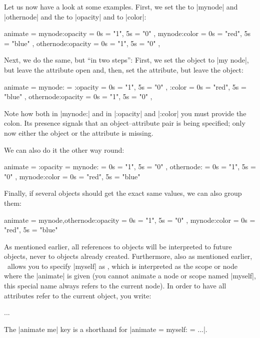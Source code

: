 Let us now have a look at some examples. First, we set the
 to |mynode| and |othernode| and the
 to |opacity| and to |color|: 

\begin{codeexample}
animate = {
  mynode:opacity    = { 0s = "1",   5s = "0" },
  mynode:color      = { 0s = "red", 5s = "blue" },
  othernode:opacity = { 0s = "1",   5s = "0" },
}
\end{codeexample}

Next, we do the same, but ``in two steps'': First, we set the object
to |my node|, but leave the attribute open and, then, set the
attribute, but leave the object:
\begin{codeexample}
animate = {
  mynode: = {
    :opacity        = { 0s = "1",   5s = "0" },
    :color          = { 0s = "red", 5s = "blue" }
  },
  othernode:opacity = { 0s = "1",   5s = "0" },
}
\end{codeexample}
Note how both in  |mynode:| and in  |:opacity| and |:color| you must
provide the colon. Its presence signals that an object--attribute pair
is being specified; only now either the object or the attribute is
missing. 

We can also do it the other way round:
\begin{codeexample}
animate = {
  :opacity = {
    mynode:         = { 0s = "1",   5s = "0" },
    othernode:      = { 0s = "1",   5s = "0" }
  },
  mynode:color      = { 0s = "red", 5s = "blue" }
}
\end{codeexample}
Finally, if several objects should get the exact same values, we can
also group them:
\begin{codeexample}
animate = {
  {mynode,othernode}:opacity = { 0s = "1",   5s = "0" },
  mynode:color               = { 0s = "red", 5s = "blue" }
}
\end{codeexample}

As mentioned earlier, all references to objects will be interpreted to
future objects, never to objects already created. Furthermore, also as
mentioned earlier, \tikzname\ allows you to specify |myself| as
, which is interpreted as the scope or node where the
|animate| is given (you cannot animate a node or scope named |myself|,
this special name always refers to the current node). In order to have
all attributes refer to the current object, you write:
\begin{codeexample}
\begin{scope} [animate = {
                 myself: = { %
                   :opacity = { ... },
                   :xshift  = { ... }
                 }
               }]
  ...
\end{scope}
\end{codeexample}
The |animate me| key is a shorthand for |animate = { myself: = {...}}|. 

